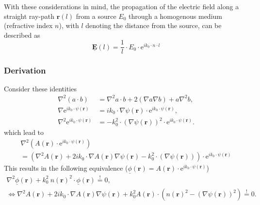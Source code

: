 With these considerations in mind, the propagation of the electric field along a straight ray-path \(\bm{r}(l)\) from a source \(E_0\) through a homogenous medium (refractive index \(n\)), with \(l\) denoting the distance from the source, can be described as
\begin{equation}
    \underline{\bm{E}}(l) = \frac{1}{l} \cdot E_0 \cdot \mathrm{e}^{i k_0 \cdot n \cdot l}
\end{equation}




\subsubsection{Derivation}\label{derivation}

Consider these identities
\begin{align}
    \nabla^2 (a \cdot b) &= \nabla^2 a \cdot b + 2 (\nabla a \nabla b) + a \nabla^2 b, \\
    \nabla \mathrm{e}^{i k_0 \cdot \psi(\bm{r})} &= i k_0 \cdot \nabla \psi(\bm{r}) \cdot \mathrm{e}^{i k_0 \cdot \psi(\bm{r})}, \\
    \nabla^2 \mathrm{e}^{i k_0 \cdot \psi(\bm{r})} &= - k_0^2 \cdot {(\nabla \psi(\bm{r}))}^2 \cdot \mathrm{e}^{i k_0 \cdot \psi(\bm{r})}.
\end{align}
which lead to
\begin{gather}
    \nabla^2 (A(\bm{r}) \cdot \mathrm{e}^{ik_0 \cdot \psi(\bm{r})}) \\
    = (\nabla^2 A(\bm{r}) + 2ik_0 \cdot \nabla A(\bm{r}) \nabla \psi(\bm{r}) - k_0^2 \cdot (\nabla \psi(\bm{r}))) \cdot \mathrm{e}^{ik_0 \cdot \psi(\bm{r})}
\end{gather}
This results in the following equivalence (\(\underline{\phi}(\bm{r}) = A(\bm{r}) \cdot \mathrm{e}^{ik_0 \cdot \psi(\bm{r})}\))
\begin{gather}
    \nabla^2 \underline{\phi}(\bm{r}) + k_0^2\ n{(\bm{r})}^2 \cdot \underline{\phi}(\bm{r}) \stackrel{!}{=} 0, \\
    \Leftrightarrow \nabla^2 A(\bm{r}) + 2ik_0 \cdot \nabla A(\bm{r}) \nabla \psi(\bm{r}) + k_0^2 A(\bm{r}) \cdot ({n(\bm{r})}^2 - {(\nabla \psi(\bm{r}))}^2) \stackrel{!}{=} 0.
\end{gather}